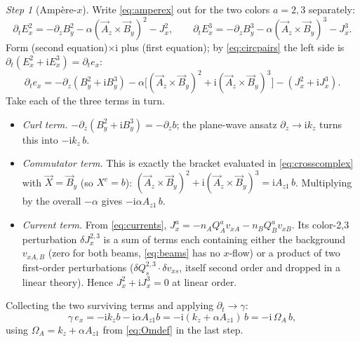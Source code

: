 \documentclass[11pt,a4paper]{article}
\numberwithin{equation}{section}
\theoremstyle{remark}
\newtheorem{step}{Step}[subsection]
\newcommand{\kz}{k_z}
\newcommand{\OmA}{\Omega_A}
\newcommand{\Az}{A_{z1}}
\newcommand{\ii}{\mathrm{i}}
\begin{document}
\begin{step}[Amp\`ere-$x$]
Write \eqref{eq:amperex} out for the two colors $a=2,3$ separately:
\begin{equation}
\partial_tE_x^2=-\partial_zB_y^2-\alpha(\vec A_z\times\vec B_y)^2-J_x^2,
\qquad
\partial_tE_x^3=-\partial_zB_y^3-\alpha(\vec A_z\times\vec B_y)^3-J_x^3 .
\end{equation}
Form (second equation)$\times\ii$ plus (first equation); by
\eqref{eq:circpairs} the left side is $\partial_t(E_x^2+\ii E_x^3)
=\partial_te_x$:
\begin{equation}
\partial_te_x=-\partial_z(B_y^2+\ii B_y^3)
-\alpha\bigl[(\vec A_z\times\vec B_y)^2+\ii(\vec A_z\times\vec B_y)^3\bigr]
-(J_x^2+\ii J_x^3).
\end{equation}
Take each of the three terms in turn.
\begin{itemize}
\item \emph{Curl term.} $-\partial_z(B_y^2+\ii B_y^3)=-\partial_zb$; the
plane-wave ansatz $\partial_z\to\ii\kz$ turns this into $-\ii\kz\,b$.
\item \emph{Commutator term.} This is exactly the bracket evaluated in
\eqref{eq:crosscomplex} with $\vec X=\vec B_y$ (so $X^c=b$):
$(\vec A_z\times\vec B_y)^2+\ii(\vec A_z\times\vec B_y)^3=\ii\Az\,b$.
Multiplying by the overall $-\alpha$ gives $-\ii\alpha\Az\,b$.
\item \emph{Current term.} From \eqref{eq:currents},
$J_x^a=-n_AQ_A^av_{xA}-n_BQ_B^av_{xB}$. Its color-2,3 perturbation
$\delta J_x^{2,3}$ is a sum of terms each containing either the background
$v_{xA,B}$ (zero for both beams, \eqref{eq:beams} has no $x$-flow) or a
product of two first-order perturbations ($\delta Q^{2,3}_s\cdot\delta
v_{xs}$, itself second order and dropped in a linear theory). Hence
$J_x^2+\ii J_x^3=0$ at linear order.
\end{itemize}
Collecting the two surviving terms and applying $\partial_t\to\gamma$:
\begin{equation}
\gamma\,e_x=-\ii\kz b-\ii\alpha\Az b
=-\ii(\kz+\alpha\Az)\,b
=-\ii\,\OmA\,b ,
\label{eq:lin-ex}
\end{equation}
using $\OmA=\kz+\alpha\Az$ from \eqref{eq:Omdef} in the last step.
\end{step}
\end{document}
